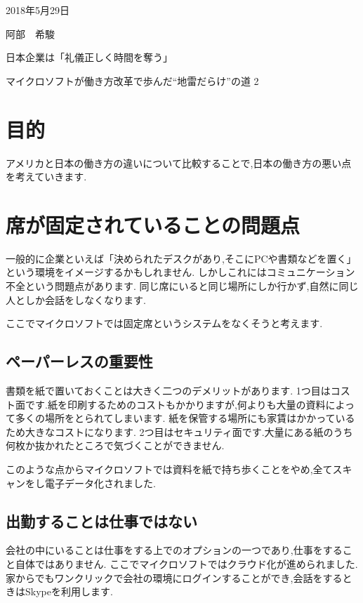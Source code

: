 \documentclass[a4j,10pt]{jsarticle}
\begin{document}
\begin{flushright} %
2018年5月29日

阿部　希駿
\end{flushright}

\begin{center}
\Large{日本企業は「礼儀正しく時間を奪う」

マイクロソフトが働き方改革で歩んだ“地雷だらけ”の道 2}
\end{center}
\section{目的} 
アメリカと日本の働き方の違いについて比較することで,日本の働き方の悪い点を考えていきます.

\section{席が固定されていることの問題点}
一般的に企業といえば「決められたデスクがあり,そこにPCや書類などを置く」という環境をイメージするかもしれません.
しかしこれにはコミュニケーション不全という問題点があります.
同じ席にいると同じ場所にしか行かず,自然に同じ人としか会話をしなくなります.

ここでマイクロソフトでは固定席というシステムをなくそうと考えます.


\subsection{ペーパーレスの重要性}
書類を紙で置いておくことは大きく二つのデメリットがあります.
1つ目はコスト面です.紙を印刷するためのコストもかかりますが,何よりも大量の資料によって多くの場所をとられてしまいます.
紙を保管する場所にも家賃はかかっているため大きなコストになります.
2つ目はセキュリティ面です.大量にある紙のうち何枚か抜かれたところで気づくことができません.

このような点からマイクロソフトでは資料を紙で持ち歩くことをやめ,全てスキャンをし電子データ化されました.

\subsection{出勤することは仕事ではない}

会社の中にいることは仕事をする上でのオプションの一つであり,仕事をすること自体ではありません.
ここでマイクロソフトではクラウド化が進められました.家からでもワンクリックで会社の環境にログインすることができ,会話をするときはSkypeを利用します.
\end{document}
